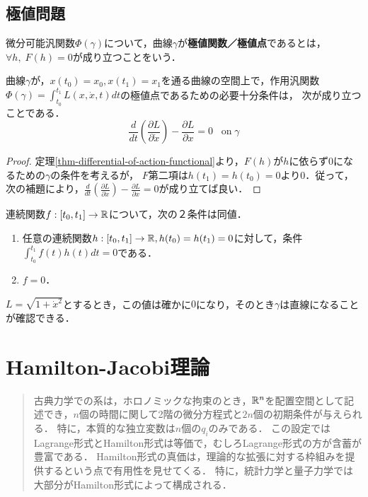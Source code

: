 \documentclass[uplatex, dvipdfmx]{jsreport}
\begin{document}
\section{極値問題}

\begin{definition}[extremal]
    微分可能汎関数$\Phi(\gamma)$について，曲線$\gamma$が\textbf{極値関数／極値点}であるとは，$\forall h,\; F(h)=0$が成り立つことをいう．
\end{definition}

\begin{theorem}\label{thm-EL-equation}
    曲線$\gamma$が，$x(t_0)=x_0,x(t_1)=x_1$を通る曲線の空間上で，作用汎関数$\Phi(\gamma)=\int^{t_1}_{t_0}L(x,\dot{x},t)dt$の極値点であるための必要十分条件は，
    次が成り立つことである．
    \[ \frac{d}{dt}\left(\frac{\partial L}{\partial\dot{x}}\right) - \frac{\partial L}{\partial x} = 0\;\;\;\mathrm{on\;}\gamma \]
\end{theorem}
\begin{proof}
    定理\ref{thm-differential-of-action-functional}より，$F(h)$が$h$に依らず$0$になるための$\gamma$の条件を考えるが，
    $F$第二項は$h(t_1)=h(t_0)=0$より$0$．従って，次の補題により，$\frac{d}{dt}\left(\frac{\partial L}{\partial\dot{x}}\right) - \frac{\partial L}{\partial x} = 0$が成り立てば良い．
\end{proof}

\begin{lemma}
    連続関数$f:[t_0,t_1]\to\mathbb{R}$について，次の２条件は同値．
    \begin{enumerate}
        \item 任意の連続関数$h:[t_0,t_1]\to\mathbb{R}, h(t_0)=h(t_1)=0$に対して，条件$\int^{t_1}_{t_0}f(t)h(t)dt=0$である．
        \item $f=0$．
    \end{enumerate}
\end{lemma}

\begin{example}
    $L=\sqrt{1+\dot{x}^2}$とするとき，この値は確かに$0$になり，そのとき$\gamma$は直線になることが確認できる．
\end{example}

\chapter{Hamilton-Jacobi理論}

\begin{quotation}
    古典力学での系は，ホロノミックな拘束のとき，$\mathbb{R}^n$を配置空間として記述でき，$n$個の時間に関して2階の微分方程式と$2n$個の初期条件が与えられる．
    特に，本質的な独立変数は$n$個の$q_i$のみである．
    この設定ではLagrange形式とHamilton形式は等価で，むしろLagrange形式の方が含蓄が豊富である．
    Hamilton形式の真価は，理論的な拡張に対する枠組みを提供するという点で有用性を見せてくる．
    特に，統計力学と量子力学では大部分がHamilton形式によって構成される．
\end{quotation}
\end{document}
